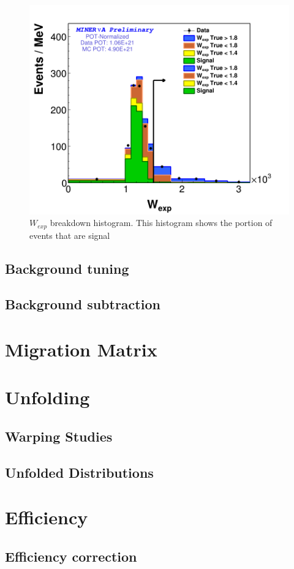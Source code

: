\begin{figure}
    \centering
    \includegraphics[scale=0.3]{Figures/Chapter4/BGStudies/Breakdown_WSideband_wexp_fit_1Pi_PN_.png}
    \caption{$W_{exp}$ breakdown histogram. This histogram shows the portion of events that are signal }
    \label{fig:enter-label}
\end{figure}


\subsection{Background tuning}

\subsection{Background subtraction}

\section{Migration Matrix}



\section{Unfolding}

\subsection{Warping Studies}

\subsection{Unfolded Distributions}


\section{Efficiency}

\subsection{Efficiency correction}
